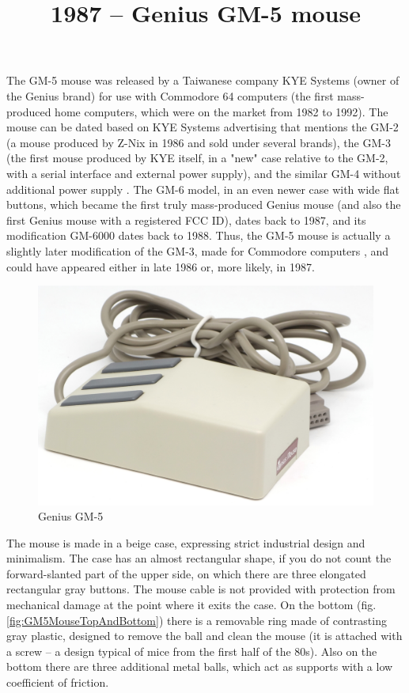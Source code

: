 \documentclass[11pt, a4paper]{article}
\begin{document}
\title{1987 -- Genius GM-5 mouse}
\date{}
\maketitle
{}

The GM-5 mouse was released by a Taiwanese company KYE Systems (owner of the Genius brand) for use with Commodore 64 computers (the first mass-produced home computers, which were on the market from 1982 to 1992). The mouse can be dated based on KYE Systems advertising that mentions the GM-2 (a mouse produced by Z-Nix in 1986 and sold under several brands), the GM-3 (the first mouse produced by KYE itself, in a "new" case relative to the GM-2, with a serial interface and external power supply), and the similar GM-4 without additional power supply \cite{YourComputer}. The GM-6 model, in an even newer case with wide flat buttons, which became the first truly mass-produced Genius mouse (and also the first Genius mouse with a registered FCC ID), dates back to 1987, and its modification GM-6000 dates back to 1988. Thus, the GM-5 mouse is actually a slightly later modification of the GM-3, made for Commodore computers \cite{armadale}, and could have appeared either in late 1986 or, more likely, in 1987.

\begin{figure}[h]
   \centering
    \includegraphics[scale=0.9]{1987_genius_gm5_mouse/pic_30.jpg}
    \caption{Genius GM-5}
    \label{fig:GM5MousePic}
\end{figure}

The mouse is made in a beige case, expressing strict industrial design and minimalism. The case has an almost rectangular shape, if you do not count the forward-slanted part of the upper side, on which there are three elongated rectangular gray buttons. The mouse cable is not provided with protection from mechanical damage at the point where it exits the case. On the bottom (fig. \ref{fig:GM5MouseTopAndBottom}) there is a removable ring made of contrasting gray plastic, designed to remove the ball and clean the mouse (it is attached with a screw -- a design typical of mice from the first half of the 80s). Also on the bottom there are three additional metal balls, which act as supports with a low coefficient of friction.
\end{document}
